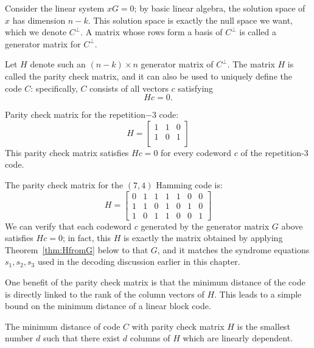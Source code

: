 Consider the linear system \(xG=0\); by basic linear algebra, the solution space of \(x\) has dimension \(n-k\). This solution space is exactly the null space we want, which we denote \(C^{\perp}\). A matrix whose rows form a basis of \(C^\perp\) is called a generator matrix for \(C^{\perp}\).


Let \(H\) denote such an \((n-k)\times n\) generator matrix of \(C^{\perp}\). The matrix \(H\) is called the parity check matrix, and it can also be used to uniquely define the code \(C\): specifically, \(C\) consists of all vectors \(c\) satisfying 
\[H c = 0.\]

\begin{example}
Parity check matrix for the repetition\(-3\) code: 
$$H = \begin{bmatrix}
    1 & 1 & 0 \\
    1 & 0 & 1 \\
\end{bmatrix}$$
This parity check matrix satisfies \(Hc = 0\) for every codeword \(c\) of the repetition-3 code.
\end{example}

\begin{example}
The parity check matrix for the \((7,4)\) Hamming code is:
$$H = \begin{bmatrix}
    0 & 1 & 1 & 1 & 1 & 0 & 0\\
    1 & 1 & 0 & 1 & 0 & 1 & 0\\
    1 & 0 & 1 & 1 & 0 & 0 & 1
\end{bmatrix}$$
We can verify that each codeword \(c\) generated by the generator matrix \(G\) above satisfies \(Hc=0\); in fact, this \(H\) is exactly the matrix obtained by applying Theorem~\ref{thm:HfromG} below to that \(G\), and it matches the syndrome equations \(s_1, s_2, s_3\) used in the decoding discussion earlier in this chapter.
\end{example}

One benefit of the parity check matrix is that the minimum distance of the code is directly linked to the rank of the column vectors of \(H\). This leads to a simple bound on the minimum distance of a linear block code.


\begin{theorem}
The minimum distance of code \(C\) with parity check matrix \(H\) is the smallest number \(d\) such that there exist \(d\) columns of \(H\) which are linearly dependent.
\label{theo:minDistance}
\end{theorem}


